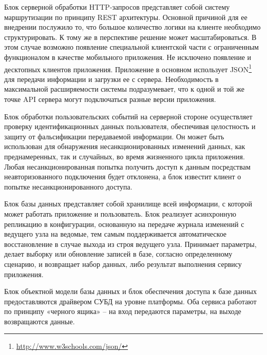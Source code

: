 Блок серверной обработки HTTP-запросов представляет собой систему маршрутизации по принципу REST архитектуры. Основной причиной для ее внедрении послужило то, что большое количество логики на клиенте необходимо структурировать. К тому же в перспективе решение может масштабироваться. В этом случае возможно появление специальной клиентской части с ограниченным функционалом в качестве мобильного приложения. Не исключено появление и десктопных клиентов приложения. Приложение в основном использует JSON\footnote{\url{http://www.w3schools.com/json/}} для передачи информации и загрузки ее с сервера. Необходимость в максимальной расширяемости системы подразумевает, что к одной и той же точке API сервера могут подключаться разные версии приложения.

Блок обработки пользовательских событий на серверной стороне осуществляет проверку идентификационных данных пользователя, обеспечивая целостность и защиту от фальсификации передаваемой информации. Он может быть использован для обнаружения несанкционированных изменений данных, как преднамеренных, так и случайных, во время жизненного цикла приложения. Любая несанкционированная попытка получить доступ к данным посредствам неавторизованного подключения будет отклонена, а блок известит клиент о попытке несанкционированного доступа.

Блок базы данных представляет собой хранилище всей информации, с которой может работать приложение и пользователь. Блок реализует асинхронную репликацию в конфигурации, основанную на передаче журнала изменений с ведущего узла на ведомые, тем самым поддерживается автоматическое восстановление в случае выхода из строя ведущего узла. Принимает параметры, делает выборку или обновление записей в базе, согласно определенному сценарию, и возвращает набор данных, либо результат выполнения сервису приложения.

Блок объектной модели базы данных и блок обеспечения доступа к базе данных предоставляются драйвером СУБД на уровне платформы. Оба сервиса работают по принципу «черного ящика» – на вход передаются параметры, на выходе возвращаются данные.